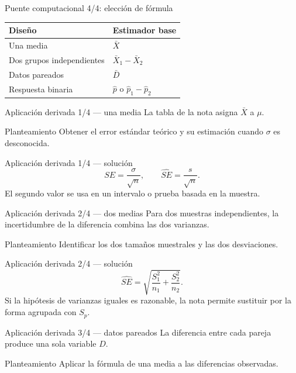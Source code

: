\documentclass[10pt,aspectratio=169]{beamer}
\begin{document}
\begin{frame}{Puente computacional 4/4: elección de fórmula}
  \footnotesize
  \begin{tabular}{ll}
    \hline
    Diseño & Estimador base \\
    \hline
    Una media & $\bar X$ \\
    Dos grupos independientes & $\bar X_1-\bar X_2$ \\
    Datos pareados & $\bar D$ \\
    Respuesta binaria & $\hat p$ o $\hat p_1-\hat p_2$ \\
    \hline
  \end{tabular}
\end{frame}

\begin{frame}{Aplicación derivada 1/4 --- una media}
  \footnotesize
  La tabla de la nota asigna $\bar X$ a $\mu$.
  \begin{block}{Planteamiento}
    Obtener el error estándar teórico y su estimación cuando $\sigma$ es
    desconocida.
  \end{block}
\end{frame}

\begin{frame}{Aplicación derivada 1/4 --- solución}
  \footnotesize
  \[
    SE=\frac{\sigma}{\sqrt n},\qquad \widehat{SE}=\frac{s}{\sqrt n}.
  \]
  El segundo valor se usa en un intervalo o prueba basada en la muestra.
\end{frame}

\begin{frame}{Aplicación derivada 2/4 --- dos medias}
  \footnotesize
  Para dos muestras independientes, la incertidumbre de la diferencia combina
  las dos varianzas.
  \begin{block}{Planteamiento}
    Identificar los dos tamaños muestrales y las dos desviaciones.
  \end{block}
\end{frame}

\begin{frame}{Aplicación derivada 2/4 --- solución}
  \footnotesize
  \[
    \widehat{SE}=\sqrt{\frac{S_1^2}{n_1}+\frac{S_2^2}{n_2}}.
  \]
  Si la hipótesis de varianzas iguales es razonable, la nota permite sustituir
  por la forma agrupada con $S_p$.
\end{frame}

\begin{frame}{Aplicación derivada 3/4 --- datos pareados}
  \footnotesize
  La diferencia entre cada pareja produce una sola variable $D$.
  \begin{block}{Planteamiento}
    Aplicar la fórmula de una media a las diferencias observadas.
  \end{block}
\end{frame}
\end{document}
